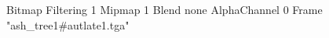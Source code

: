 {Bitmap
	{Filtering 1}
	{Mipmap 1}
	{Blend none}
	{AlphaChannel 0}
	{Frame "ash_tree1#autlate1.tga"}
}
